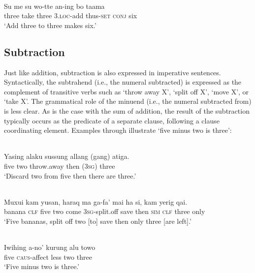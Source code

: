 \ea%
\label{bkm:Ref342663723}
\\
\gll   Su  me  su  wo-tte  an-ing  bo  taama\\  
   three   take  three  3.\textsc{loc}{}-add  thus-\textsc{set}   \textsc{conj}  six  \\
\glt `Add three to three makes six.'  
\z



 

  

\subsection{Subtraction}
\label{sec:8:Subtraction}
Just like addition, subtraction is also expressed in imperative sentences. Syntactically, the subtrahend (i.e., the numeral subtracted) is expressed as the complement of transitive verbs such as `throw away X', `split off X', `move X', or `take X'. The grammatical role of the minuend (i.e., the numeral subtracted from) is less clear. As is the case with the sum of addition, the result of the subtraction typically occurs as the predicate of a separate clause, following a clause coordinating element. Examples  through  illustrate `five minus two is three':


\ea%
\label{bkm:Ref358042906}
\\
\gll  Yasing  alaku  sussung  allang  (gang)  atiga.  \\  
   five  two  throw.away  then  (\textsc{3sg) } three  \\
\glt `Discard two from five then there are three.'
\z

 

\ea
\label{ex:8:1240}
\\
 \gll Muxui  kam  yusan,     haraq  ma  ga-fa'   mai   ha  si,  kam  yerig   qai.      \\
    banana  \textsc{clf}  five   two  come  \textsc{3sg-}split.off  save  then  \textsc{sim}  \textsc{clf} three  only    \\
 \glt `Five bananas,    split off two [to] save then only three [are left].' 
\z
 
\ea
\label{ex:8:1241}
\\ 
\gll Iwihing  a-no'   kurung  alu  towo\\
 five  \textsc{caus}{}-affect  less  two  three\\
\glt `Five minus two is three.' 
\z  


